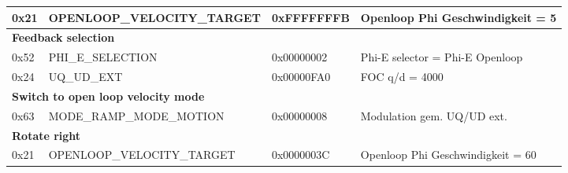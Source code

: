 \begin{table}[H]
\begin{tabularx}{\textwidth}{|l|l|l|X|}
0x21         & OPENLOOP\_VELOCITY\_TARGET  & 0xFFFFFFFB & Openloop Phi Geschwindigkeit = 5    \\ \hline
\multicolumn{4}{|l|}{\textbf{Feedback selection}}                      \\ \hline
0x52         & PHI\_E\_SELECTION           & 0x00000002 & Phi-E selector = Phi-E Openloop    \\ \hline
0x24         & UQ\_UD\_EXT                 & 0x00000FA0 & FOC q/d = 4000  \\ \hline
\multicolumn{4}{|l|}{\textbf{Switch to open loop velocity mode}}       \\ \hline
0x63         & MODE\_RAMP\_MODE\_MOTION    & 0x00000008 & Modulation gem. UQ/UD ext. \\ \hline
\multicolumn{4}{|l|}{\textbf{Rotate right}}                            \\ \hline
0x21         & OPENLOOP\_VELOCITY\_TARGET  & 0x0000003C & Openloop Phi Geschwindigkeit = 60    \\ \hline
\end{tabularx}
\end{table}
